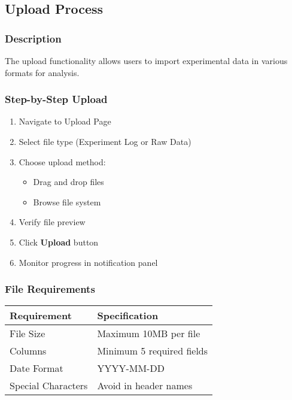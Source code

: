 \documentclass[12pt]{article}
\begin{document}
\subsection{Upload Process}
\subsubsection*{Description}
The upload functionality allows users to import experimental data in various
formats for analysis.

\subsubsection{Step-by-Step Upload}
\begin{enumerate}
    \item Navigate to Upload Page
    \item Select file type (Experiment Log or Raw Data)
    \item Choose upload method:
    \begin{itemize}
        \item Drag and drop files
        \item Browse file system
    \end{itemize}
    \item Verify file preview
    \item Click \textbf{Upload} button
    \item Monitor progress in notification panel
\end{enumerate}

\subsubsection{File Requirements}
\begin{table}[H]
    \centering
    \begin{tabularx}{\textwidth}{lX}
        \toprule
        \textbf{Requirement} & \textbf{Specification} \\
        \midrule
        File Size & Maximum 10MB per file \\
        Columns & Minimum 5 required fields \\
        Date Format & YYYY-MM-DD \\
        Special Characters & Avoid in header names \\
        \bottomrule
    \end{tabularx}
\end{table}
\end{document}
